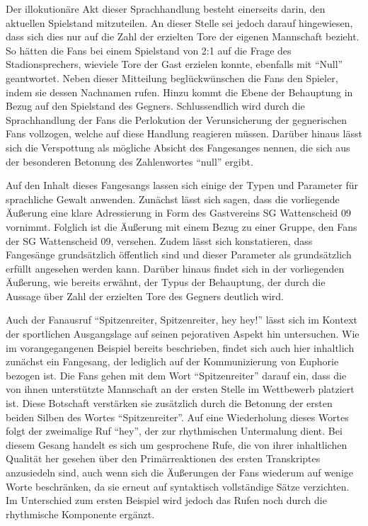 Der illokutionäre Akt dieser Sprachhandlung besteht einerseits darin, den aktuellen Spielstand mitzuteilen.
An dieser Stelle sei jedoch darauf hingewiesen, dass sich dies nur auf die Zahl der erzielten Tore der eigenen Mannschaft bezieht.
So hätten die Fans bei einem Spielstand von 2:1 auf die Frage des Stadionsprechers, wieviele Tore der Gast erzielen konnte, ebenfalls mit "`Null"' geantwortet.
Neben dieser Mitteilung beglückwünschen die Fans den Spieler, indem sie dessen Nachnamen rufen.
Hinzu kommt die Ebene der Behauptung in Bezug auf den Spielstand des Gegners.
Schlussendlich wird durch die Sprachhandlung der Fans die Perlokution der Verunsicherung der gegnerischen Fans vollzogen, welche auf diese Handlung reagieren müssen.
Darüber hinaus lässt sich die Verspottung als mögliche Absicht des Fangesanges nennen, die sich aus der besonderen Betonung des Zahlenwortes "`null"' ergibt.

Auf den Inhalt dieses Fangesangs lassen sich einige der Typen und Parameter für sprachliche Gewalt anwenden.
Zunächst lässt sich sagen, dass die vorliegende Äußerung eine klare Adressierung in Form des Gastvereins SG Wattenscheid 09 vornimmt.
Folglich ist die Äußerung mit einem Bezug zu einer Gruppe, den Fans der SG Wattenscheid 09, versehen.
Zudem lässt sich konstatieren, dass Fangesänge grundsätzlich öffentlich sind und dieser Parameter als grundsätzlich erfüllt angesehen werden kann.
Darüber hinaus findet sich in der vorliegenden Äußerung, wie bereits erwähnt, der Typus der Behauptung, der durch die Aussage über Zahl der erzielten Tore des Gegners deutlich wird.

Auch der Fanausruf "`Spitzenreiter, Spitzenreiter, hey hey!"' lässt sich im Kontext der sportlichen Ausgangslage auf seinen pejorativen Aspekt hin untersuchen.
Wie im vorangegangenen Beispiel bereits beschrieben, findet sich auch hier inhaltlich zunächst ein Fangesang, der lediglich auf der Kommunizierung von Euphorie bezogen ist.
Die Fans gehen mit dem Wort "`Spitzenreiter"' darauf ein, dass die von ihnen unterstützte Mannschaft an der ersten Stelle im Wettbewerb platziert ist.
Diese Botschaft verstärken sie zusätzlich durch die Betonung der ersten beiden Silben des Wortes "`Spitzenreiter"'.
Auf eine Wiederholung dieses Wortes folgt der zweimalige Ruf "`hey"', der zur rhythmischen Untermalung dient.
Bei diesem Gesang handelt es sich um gesprochene Rufe, die von ihrer inhaltlichen Qualität her gesehen über den Primärreaktionen des ersten Transkriptes anzusiedeln sind, auch wenn sich die Äußerungen der Fans wiederum auf wenige Worte beschränken, da sie erneut auf syntaktisch vollständige Sätze verzichten.
Im Unterschied zum ersten Beispiel wird jedoch das Rufen noch durch die rhythmische Komponente ergänzt.

